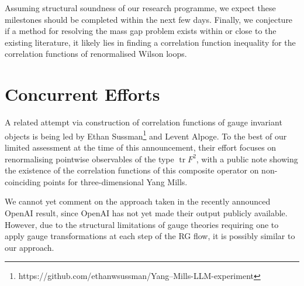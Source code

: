 \documentclass[12pt]{article}
\DeclareMathOperator{\tr}{tr}
\begin{document}
Assuming structural soundness of our research programme, we expect these milestones should be completed within the next few days. Finally, we conjecture if a method for resolving the mass gap problem exists within or close to the existing literature, it likely lies in finding a correlation function inequality for the correlation functions of renormalised Wilson loops. 



\section{Concurrent Efforts}

A related attempt via construction of correlation functions of gauge invariant objects is being led by Ethan Sussman\footnote{https://github.com/ethanwsussman/Yang--Mills-LLM-experiment} and Levent Alpoge. To the best of our limited assessment at the time of this announcement, their effort focuses on renormalising pointwise observables of the type $\tr F^2$, with a public note showing the existence of the correlation functions of this composite operator on non-coinciding points for three-dimensional Yang Mills. 


We cannot yet comment on the approach taken in the recently announced OpenAI result, since OpenAI has not yet made their output publicly available. However, due to the structural limitations of gauge theories requiring one to apply gauge transformations at each step of the RG flow, it is possibly similar to our approach. 
\end{document}
